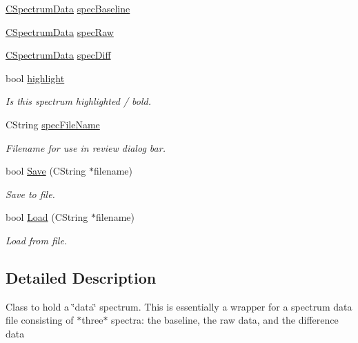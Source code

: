  \begin{DoxyCompactItemize}
\item 
\hyperlink{classCSpectrumData}{CSpectrumData} \hyperlink{classCDSpectrumData_a910af6c1fe89fdda34d1dfc97f5cbed4}{specBaseline}
\item 
\hyperlink{classCSpectrumData}{CSpectrumData} \hyperlink{classCDSpectrumData_aa41bef09f10b5b025fd102284893c60e}{specRaw}
\item 
\hyperlink{classCSpectrumData}{CSpectrumData} \hyperlink{classCDSpectrumData_a37814cb5808f3445fc9bee05547d4a95}{specDiff}
\item 
bool \hyperlink{classCDSpectrumData_a8929501647ef7e4adf88dc9b22ce9592}{highlight}
\begin{DoxyCompactList}\small\item\em Is this spectrum highlighted / bold. \item\end{DoxyCompactList}\item 
CString \hyperlink{classCDSpectrumData_adcfd9086f45d3809b7ad12cf30469786}{specFileName}
\begin{DoxyCompactList}\small\item\em Filename for use in review dialog bar. \item\end{DoxyCompactList}\item 
bool \hyperlink{classCDSpectrumData_a1bc0205c8aa9c6ebe15954dbd2e847aa}{Save} (CString $\ast$filename)
\begin{DoxyCompactList}\small\item\em Save to file. \item\end{DoxyCompactList}\item 
bool \hyperlink{classCDSpectrumData_ad748452cc3b1a7144d01cac1d114f112}{Load} (CString $\ast$filename)
\begin{DoxyCompactList}\small\item\em Load from file. \item\end{DoxyCompactList}\end{DoxyCompactItemize}


\subsection{Detailed Description}
Class to hold a \char`\"{}data\char`\"{} spectrum. This is essentially a wrapper for a spectrum data file consisting of $\ast$three$\ast$ spectra: the baseline, the raw data, and the difference data 

